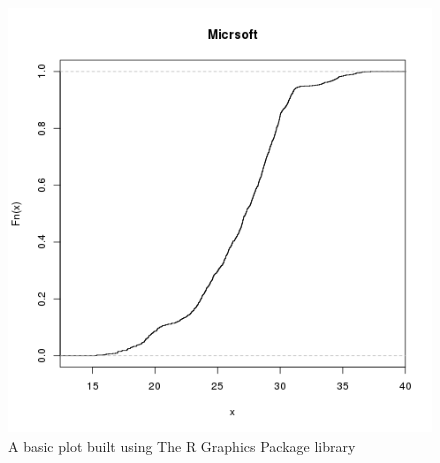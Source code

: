 \documentclass[
  twoside,
  11pt, a4paper,
  footinclude=true,
  headinclude=true,
  cleardoublepage=empty
]{scrreprt}
\begin{document}
    \begin{figure}[H]
        \includegraphics[scale=0.5]{RPlotExample.png}
        \centering
        \caption{A basic plot built using The R Graphics Package library}
        \label{fig:RPlotExampl}
    \end{figure}
    
     
\end{document}
